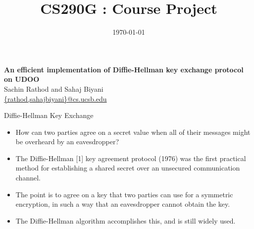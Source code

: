\documentclass[xcolor=dvipsnames]{beamer}
\author{}
\institute{UCSB Computer Science}
\title{CS290G : Course Project}
\date{\today}
\begin{document}
\begin{frame}
\begin{center}
\textbf{\Large An efficient implementation of Diffie-Hellman key exchange protocol on UDOO}  \\[1em]
Sachin Rathod and Sahaj Biyani \\
\url{{rathod,sahajbiyani}@cs.ucsb.edu} \\[1em]

\end{center}
\end{frame}

\begin{frame}{Diffie-Hellman Key Exchange}
\begin{itemize}
\item How can two parties agree on a secret value when all of their
messages might be overheard by an eavesdropper?
\item The Diffie-Hellman [1] key agreement protocol (1976) was the first
practical method for establishing a shared secret over an unsecured
communication channel.
\item  The point is to agree on a key that two parties can use for a
symmetric encryption, in such a way that an eavesdropper cannot
obtain the key.
\item The Diffie-Hellman algorithm accomplishes this, and is still
widely used.
\medskip
\end{itemize}
\end{frame}
\end{document}
